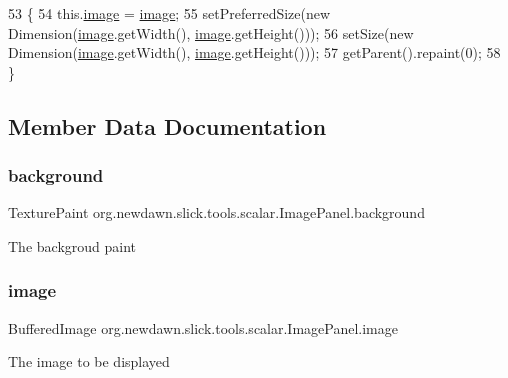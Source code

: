 \begin{DoxyCode}
53                                               \{
54         this.\mbox{\hyperlink{classorg_1_1newdawn_1_1slick_1_1tools_1_1scalar_1_1_image_panel_aecb459cf2f3adb87a772fdd4db61c191}{image}} = \mbox{\hyperlink{classorg_1_1newdawn_1_1slick_1_1tools_1_1scalar_1_1_image_panel_aecb459cf2f3adb87a772fdd4db61c191}{image}};
55         setPreferredSize(\textcolor{keyword}{new} Dimension(\mbox{\hyperlink{classorg_1_1newdawn_1_1slick_1_1tools_1_1scalar_1_1_image_panel_aecb459cf2f3adb87a772fdd4db61c191}{image}}.getWidth(), \mbox{\hyperlink{classorg_1_1newdawn_1_1slick_1_1tools_1_1scalar_1_1_image_panel_aecb459cf2f3adb87a772fdd4db61c191}{image}}.getHeight()));
56         setSize(\textcolor{keyword}{new} Dimension(\mbox{\hyperlink{classorg_1_1newdawn_1_1slick_1_1tools_1_1scalar_1_1_image_panel_aecb459cf2f3adb87a772fdd4db61c191}{image}}.getWidth(), \mbox{\hyperlink{classorg_1_1newdawn_1_1slick_1_1tools_1_1scalar_1_1_image_panel_aecb459cf2f3adb87a772fdd4db61c191}{image}}.getHeight()));
57         getParent().repaint(0);
58     \}
\end{DoxyCode}


\subsection{Member Data Documentation}
\mbox{\label{classorg_1_1newdawn_1_1slick_1_1tools_1_1scalar_1_1_image_panel_a79f834ce107fe8e724112271649f0af8}} 
\subsubsection{\texorpdfstring{background}{background}}
{\footnotesize\ttfamily Texture\+Paint org.\+newdawn.\+slick.\+tools.\+scalar.\+Image\+Panel.\+background\hspace{0.3cm}{\ttfamily [private]}}

The backgroud paint \mbox{\label{classorg_1_1newdawn_1_1slick_1_1tools_1_1scalar_1_1_image_panel_aecb459cf2f3adb87a772fdd4db61c191}} 
\subsubsection{\texorpdfstring{image}{image}}
{\footnotesize\ttfamily Buffered\+Image org.\+newdawn.\+slick.\+tools.\+scalar.\+Image\+Panel.\+image\hspace{0.3cm}{\ttfamily [private]}}

The image to be displayed 